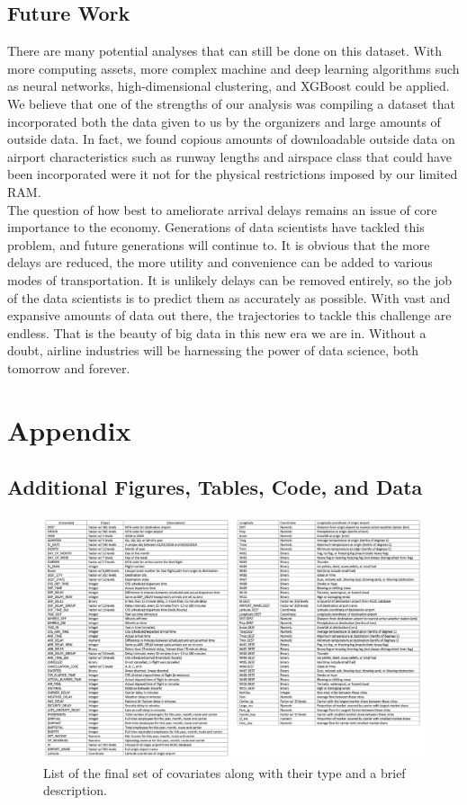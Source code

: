 \documentclass[12pt, a4paper, openany]{book}
\newcommand\tab[1][1cm]{\hspace*{#1}}
\begin{document}
	\section{Future Work}
	\tab There are many potential analyses that can still be done on this dataset. With more computing assets, more complex machine and deep learning algorithms such as neural networks, high-dimensional clustering, and XGBoost could be applied. We believe that one of the strengths of our analysis was compiling a dataset that incorporated both the data given to us by the organizers and large amounts of outside data. In fact, we found copious amounts of downloadable outside data on airport characteristics such as runway lengths and airspace class that could have been incorporated were it not for the physical restrictions imposed by our limited RAM. \\
	\tab The question of how best to ameliorate arrival delays remains an issue of core importance to the economy. Generations of data scientists have tackled this problem, and future generations will continue to. It is obvious that the more delays are reduced, the more utility and convenience can be added to various modes of transportation. It is unlikely delays can be removed entirely, so the job of the data scientists is to predict them as accurately as possible. With vast and expansive amounts of data out there, the trajectories to tackle this challenge are endless. That is the beauty of big data in this new era we are in. Without a doubt, airline industries will be harnessing the power of data science, both tomorrow and forever.
\chapter{Appendix}
	\section{Additional Figures, Tables, Code, and Data}
			\begin{figure}[h]
			\centering
	 		\includegraphics[width = 1 \textwidth]{../figures/PLOTS FOR REPORT/Covariate List}
	 		\caption{List of the final set of covariates along with their type and a brief description.}
	 		\end{figure}
\end{document}
